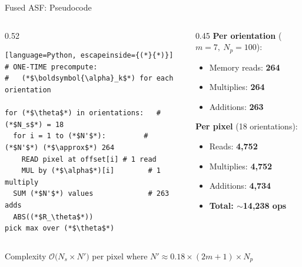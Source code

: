 \documentclass[10pt, aspectratio=169]{beamer}
\begin{document}
\begin{frame}[fragile]{Fused ASF: Pseudocode}
  \begin{columns}[T]
    \begin{column}{0.52\textwidth}
      \begin{lstlisting}[language=Python, escapeinside={(*}{*)}]
# ONE-TIME precompute:
#   (*$\boldsymbol{\alpha}_k$*) for each orientation

for (*$\theta$*) in orientations:   # (*$N_s$*) = 18
  for i = 1 to (*$N'$*):         # (*$N'$*) (*$\approx$*) 264
    READ pixel at offset[i] # 1 read
    MUL by (*$\alpha$*)[i]        # 1 multiply
  SUM (*$N'$*) values             # 263 adds
  ABS((*$R_\theta$*))
pick max over (*$\theta$*)
      \end{lstlisting}
    \end{column}
    \begin{column}{0.45\textwidth}
      \textbf{Per orientation} ($m{=}7,\ N_p{=}100$):
      \begin{itemize}
        \item Memory reads: \textbf{264}
        \item Multiplies: \textbf{264}
        \item Additions: \textbf{263}
      \end{itemize}

      \vspace{0.6em}
      \textbf{Per pixel} (18 orientations):
      \begin{itemize}
        \item Reads: \textbf{4,752}
        \item Multiplies: \textbf{4,752}
        \item Additions: \textbf{4,734}
        \item[\color{UofSCHorseshoe}$\blacksquare$] \textbf{Total: $\sim$14,238 ops}
      \end{itemize}
    \end{column}
  \end{columns}

  \vspace{0.3em}
  \begin{block}{Complexity}
    $\mathcal{O}\!\bigl(N_s \times N'\bigr)$ per pixel \qquad where $N' \approx 0.18 \times (2m{+}1) \times N_p$
  \end{block}
\end{frame}

\end{document}
